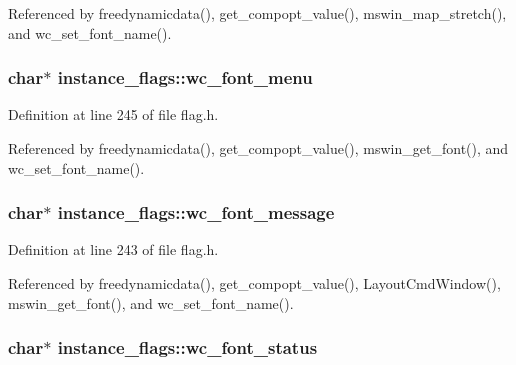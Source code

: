 Referenced by freedynamicdata(), get\+\_\+compopt\+\_\+value(), mswin\+\_\+map\+\_\+stretch(), and wc\+\_\+set\+\_\+font\+\_\+name().

\hypertarget{structinstance__flags_a2feb69a3cf238cd4018f1c76f622ad17}{
\subsubsection[{wc\+\_\+font\+\_\+menu}]{\setlength{\rightskip}{0pt plus 5cm}char$\ast$ instance\+\_\+flags\+::wc\+\_\+font\+\_\+menu}}\label{structinstance__flags_a2feb69a3cf238cd4018f1c76f622ad17}


Definition at line 245 of file flag.\+h.



Referenced by freedynamicdata(), get\+\_\+compopt\+\_\+value(), mswin\+\_\+get\+\_\+font(), and wc\+\_\+set\+\_\+font\+\_\+name().

\hypertarget{structinstance__flags_a1cd982dcf1dd4bebc211a2d38dc74eea}{
\subsubsection[{wc\+\_\+font\+\_\+message}]{\setlength{\rightskip}{0pt plus 5cm}char$\ast$ instance\+\_\+flags\+::wc\+\_\+font\+\_\+message}}\label{structinstance__flags_a1cd982dcf1dd4bebc211a2d38dc74eea}


Definition at line 243 of file flag.\+h.



Referenced by freedynamicdata(), get\+\_\+compopt\+\_\+value(), Layout\+Cmd\+Window(), mswin\+\_\+get\+\_\+font(), and wc\+\_\+set\+\_\+font\+\_\+name().

\hypertarget{structinstance__flags_a6b5bba710c4e80b026a4c1e77d015489}{
\subsubsection[{wc\+\_\+font\+\_\+status}]{\setlength{\rightskip}{0pt plus 5cm}char$\ast$ instance\+\_\+flags\+::wc\+\_\+font\+\_\+status}}\label{structinstance__flags_a6b5bba710c4e80b026a4c1e77d015489}


